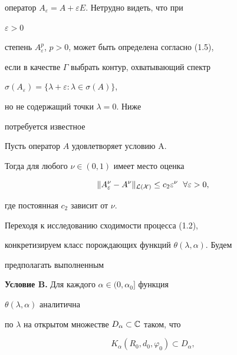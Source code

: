 оператор $A_\varepsilon=A+\varepsilon E$. Нетрудно видеть, что при 


$\varepsilon>0$ 


степень $A^p_\varepsilon$, $p>0$, может быть определена согласно (1.5), 


если в качестве $\Gamma$ выбрать контур, охватывающий спектр 


$\sigma(A_\varepsilon)=\{\lambda+\varepsilon:\lambda\in\sigma(A)\}$, 


но не содержащий точки $\lambda=0$. Ниже 


потребуется известное 


 


\begin{prop} 


Пусть оператор $A$ удовлетворяет условию $\mathrm A$. 


Тогда для любого $\nu\in(0,1)$ имеет место оценка 


\begin{equation} 


\|A^\nu_\varepsilon-A^\nu\|_{\cal L(X)} 


\le c_2\varepsilon^\nu\ \; \forall\varepsilon>0, 


\end{equation} 


где постоянная $c_2$ зависит от $\nu$. 


\end{prop} 


 


Переходя к исследованию сходимости процесса (1.2), 


конкретизируем класс порождающих функций $\theta(\lambda,\alpha)$. Будем 


предполагать выполненным


\medskip 


 


{\bf Условие B.} Для каждого $\alpha\in(0,\alpha_0]$ функция 


$\theta(\lambda,\alpha)$ аналитична 


по $\lambda$ на открытом множестве $D_\alpha\subset\Bbb C$ таком, что 


\begin{equation} 


K_\alpha(R_0,d_0,\varphi_0)\subset D_\alpha, 


\end{equation} 


